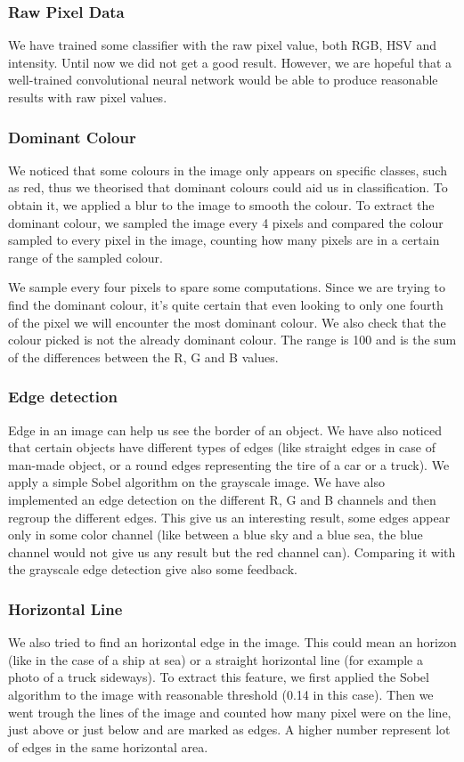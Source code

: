 \documentclass{article} %
\begin{document}
\subsubsection{Raw Pixel Data}
We have trained some classifier with the raw pixel value, both RGB, HSV and intensity. Until now we did not get a good result. However, we are hopeful that a well-trained convolutional neural network would be able to produce reasonable results with raw pixel values.

\subsubsection{Dominant Colour}
We noticed that some colours in the image only appears on specific classes, such as red, thus we theorised that dominant colours could aid us in classification. To obtain it, we applied a blur to the image to smooth the colour. To extract the dominant colour, we sampled the image every 4 pixels and compared the colour sampled to every pixel in the image, counting how many pixels are in a certain range of the sampled colour.

We sample every four pixels to spare some computations. Since we are trying to find the dominant colour, it's quite certain that even looking to only one fourth of the pixel we will encounter the most dominant colour. We also check that the colour picked is not the already dominant colour. The range is 100 and is the sum of the differences between the R, G and B values. 

\subsubsection{Edge detection}
Edge in an image can help us see the border of an object. We have also noticed that certain objects have different types of edges (like straight edges in case of man-made object, or a round edges representing the tire of a car or a truck).
We apply a simple Sobel algorithm on the grayscale image. We have also implemented an edge detection on the different R, G and B channels and then regroup the different edges. This give us an interesting result, some edges appear only in some color channel (like between a blue sky and a blue sea, the blue channel would not give us any result but the red channel can). Comparing it with the grayscale edge detection give also some feedback.

\subsubsection{Horizontal Line}
We also tried to find an horizontal edge in the image. This could mean an horizon (like in the case of a ship at sea) or a straight horizontal line (for example a photo of a truck sideways). To extract this feature, we first applied the Sobel algorithm to the image with reasonable threshold (0.14 in this case). Then we went trough the lines of the image and counted how many pixel were on the line, just above or just below and are marked as edges. A higher number represent lot of edges in the same horizontal area. 
\end{document}
